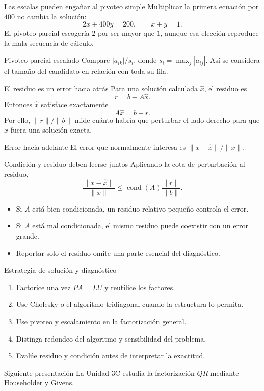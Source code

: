 \documentclass[aspectratio=169,12pt]{beamer}
\DeclareMathOperator{\cond}{cond}
\begin{document}
\begin{frame}{Las escalas pueden engañar al pivoteo simple}
Multiplicar la primera ecuación por $400$ no cambia la solución:
\[
2x+400y=200,
\qquad
x+y=1.
\]
El pivoteo parcial escogería $2$ por ser mayor que $1$, aunque esa elección
reproduce la mala secuencia de cálculo.
\begin{block}{Pivoteo parcial escalado}
Compare $|a_{ik}|/s_i$, donde $s_i=\max_j|a_{ij}|$. Así se considera el tamaño
del candidato en relación con toda su fila.
\end{block}
\end{frame}

\begin{frame}{El residuo es un error hacia atrás}
Para una solución calculada $\widehat x$, el residuo es
\[
r=b-A\widehat x.
\]
Entonces $\widehat x$ satisface exactamente
\[
A\widehat x=b-r.
\]
Por ello, $\|r\|/\|b\|$ mide cuánto habría que perturbar el lado derecho para
que $\widehat x$ fuera una solución exacta.
\begin{block}{Error hacia adelante}
El error que normalmente interesa es $\|x-\widehat x\|/\|x\|$.
\end{block}
\end{frame}

\begin{frame}{Condición y residuo deben leerse juntos}
Aplicando la cota de perturbación al residuo,
\[
\frac{\|x-\widehat x\|}{\|x\|}
\leq
\cond(A)\frac{\|r\|}{\|b\|}.
\]
\begin{itemize}
  \item Si $A$ está bien condicionada, un residuo relativo pequeño controla el error.
  \item Si $A$ está mal condicionada, el mismo residuo puede coexistir con un error grande.
  \item Reportar solo el residuo omite una parte esencial del diagnóstico.
\end{itemize}
\end{frame}

\begin{frame}{Estrategia de solución y diagnóstico}
\begin{enumerate}
  \item Factorice una vez $PA=LU$ y reutilice los factores.
  \item Use Cholesky o el algoritmo tridiagonal cuando la estructura lo permita.
  \item Use pivoteo y escalamiento en la factorización general.
  \item Distinga redondeo del algoritmo y sensibilidad del problema.
  \item Evalúe residuo y condición antes de interpretar la exactitud.
\end{enumerate}
\begin{block}{Siguiente presentación}
La Unidad 3C estudia la factorización $QR$ mediante Householder y Givens.
\end{block}
\end{frame}
\end{document}
